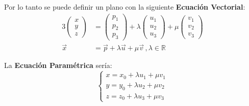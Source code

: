 \documentclass[arial,a4paper,print]{article}
\begin{document}
Por lo tanto se puede definir un plano con la siguiente \textbf{Ecuación Vectorial}:
\begin{alignat*}{3}
	\begin{pmatrix} x \\ y \\ z \end{pmatrix} 
	&= \begin{pmatrix} p_{1} \\ p_{2} \\ p_{3} \end{pmatrix} 
	+\lambda\begin{pmatrix} u_{1} \\ u_{2} \\ u_{3} \end{pmatrix} +\mu\begin{pmatrix} v_{1} \\ v_{2} \\ v_{3} \end{pmatrix} 
	\\
	\vec{x} &=\vec{p} +\lambda\vec{u} + \mu\vec{v}\, , \lambda \in \mathbb{R}
\end{alignat*}

La \textbf{Ecuación Paramétrica} sería:
\begin{equation*}
	\begin{cases}
		x = x_{0} + \lambda u_{1} + \mu v_{1} \\
		y = y_{0} + \lambda u_{2} + \mu v_{2} \\
		z = z_{0} + \lambda u_{3} + \mu v_{3} 
	\end{cases}
\end{equation*}
\end{document}
